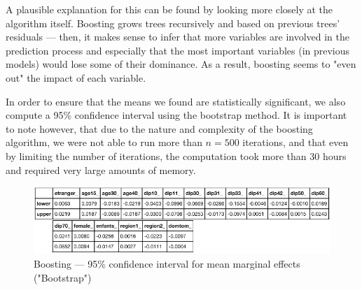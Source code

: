 A plausible explanation for this can be found by looking more closely at the algorithm itself. Boosting grows trees recursively and based on previous trees' residuals --- then, it makes sense to infer that more variables are involved in the prediction process and especially that the most important variables (in previous models) would lose some of their dominance. As a result, boosting seems to "even out" the impact of each variable.



In order to ensure that the means we found are statistically significant, we also compute a 95\% confidence interval using the bootstrap method. It is important to note however, that due to the nature and complexity of the boosting algorithm, we were not able to run more than $n=500$ iterations, and that even by limiting the number of iterations, the computation took more than 30 hours and required very large amounts of memory.

\begin{figure}
    \centering
    \includegraphics[scale=0.25]{img/boosting_bootstrap.png}
    \caption{Boosting --- 95\% confidence interval for mean marginal effects ("Bootstrap")}
    \label{fig:boosting_bootstrap}
\end{figure}

